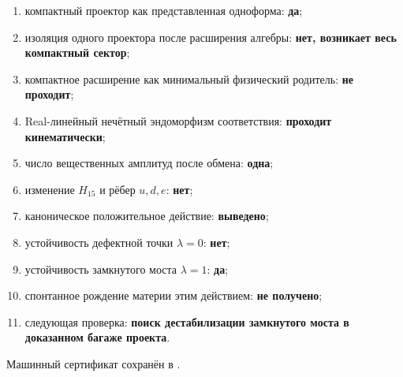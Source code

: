 \begin{protocol}
\begin{enumerate}
 \item компактный проектор как представленная одноформа: \textbf{да};
 \item изоляция одного проектора после расширения алгебры:
 \textbf{нет, возникает весь компактный сектор};
 \item компактное расширение как минимальный физический родитель:
 \textbf{не проходит};
 \item Real-линейный нечётный эндоморфизм соответствия:
 \textbf{проходит кинематически};
 \item число вещественных амплитуд после обмена: \textbf{одна};
 \item изменение $H_{15}$ и рёбер $u,d,e$: \textbf{нет};
 \item каноническое положительное действие: \textbf{выведено};
 \item устойчивость дефектной точки $\lambda=0$: \textbf{нет};
 \item устойчивость замкнутого моста $\lambda=1$: \textbf{да};
 \item спонтанное рождение материи этим действием: \textbf{не получено};
 \item следующая проверка:
 \textbf{поиск дестабилизации замкнутого моста в доказанном багаже проекта}.
\end{enumerate}
\end{protocol}

Машинный сертификат сохранён в
.